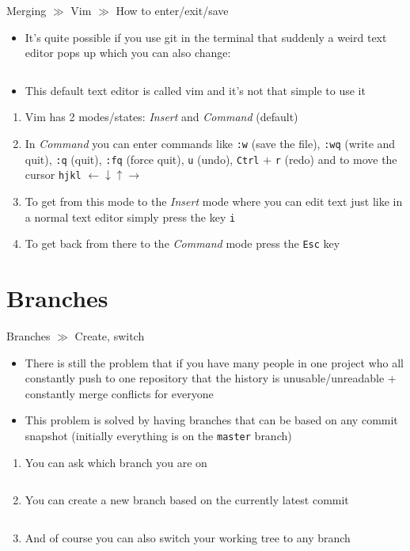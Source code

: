 \documentclass[10pt]{beamer}
\begin{document}
\begin{frame}{Merging $\gg$ Vim $\gg$ How to enter/exit/save}
	\begin{itemize}
		\item It's quite possible if you use git in the terminal that suddenly a weird text editor pops up which you can also change:
		\inputminted[bgcolor=lightGreyCustom,fontsize=\scriptsize]{sh}{./resources/git_merging_07_change_text_editor.sh}
		\item This default text editor is called vim and it's not that simple to use it
	\end{itemize}
	\begin{enumerate}
		\item Vim has 2 modes/states: \textit{Insert} and \textit{Command} (default)
		\item In \textit{Command} you can enter commands like \texttt{:w} (save the file), \texttt{:wq} (write and quit), \texttt{:q} (quit), \texttt{:fq} (force quit), \texttt{u} (undo), \texttt{Ctrl} $+$ \texttt{r} (redo) and to move the cursor \texttt{hjkl} $\leftarrow\downarrow\uparrow\rightarrow$ 
		\item To get from this mode to the \textit{Insert} mode where you can edit text just like in a normal text editor simply press the key \texttt{i}
		\item To get back from there to the \textit{Command} mode press the \texttt{Esc} key
	\end{enumerate}
\end{frame}

\section{Branches}

\begin{frame}{Branches $\gg$ Create, switch}
	\begin{itemize}
		\item There is still the problem that if you have many people in one project who all constantly push to one repository that the history is unusable/unreadable $+$ constantly merge conflicts for everyone
		\item This problem is solved by having branches that can be based on any commit snapshot (initially everything is on the \texttt{master} branch)
	\end{itemize}
	\begin{enumerate}
		\item You can ask which branch you are on
		\inputminted[bgcolor=lightGreyCustom,fontsize=\scriptsize]{sh}{./resources/git_branches_01_branch.sh}
		\item You can create a new branch based on the currently latest commit
		\inputminted[bgcolor=lightGreyCustom,fontsize=\scriptsize]{sh}{./resources/git_branches_02_create.sh}
		\item And of course you can also switch your working tree to any branch
		\inputminted[bgcolor=lightGreyCustom,fontsize=\scriptsize]{sh}{./resources/git_branches_03_checkout.sh}
	\end{enumerate}
\end{frame}
\end{document}
